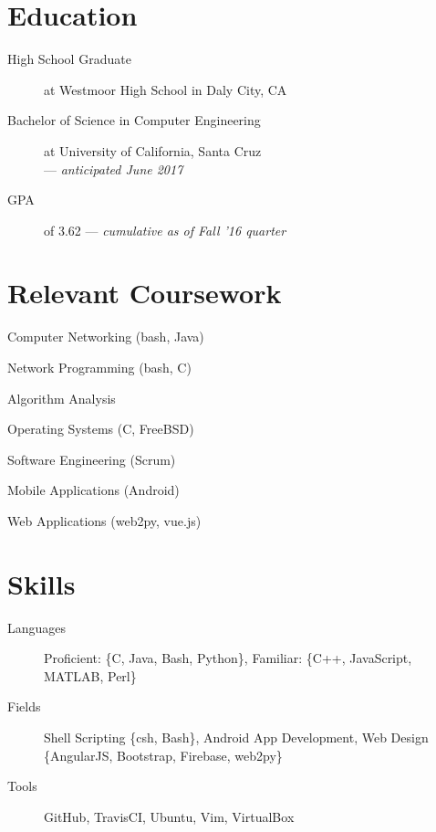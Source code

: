 \documentclass[11pt]{article}
\author{August Valera}
\begin{document}

\section*{Education}
\begin{description}
  \item[High School Graduate] at Westmoor High School in Daly City, CA
  \item[Bachelor of Science in Computer Engineering] at University of
    California, Santa Cruz \\ --- \textit{anticipated June 2017}
  \item[GPA] of 3.62 --- \textit{cumulative as of Fall '16 quarter}
\end{description}

\section*{Relevant Coursework}
\begin{itemize}
    \begin{multicols}{2}
    \item Computer Networking (bash, Java) %
    \item Network Programming (bash, C) %
    \item Algorithm Analysis %
    \item Operating Systems (C, FreeBSD) %
    \item Software Engineering (Scrum) %
    \item Mobile Applications (Android) %
    \item Web Applications (web2py, vue.js) %
    \end{multicols}
\end{itemize}

\section*{Skills}
\begin{description}
  \item[Languages] Proficient: \{C, Java, Bash, Python\},
    Familiar: \{C++, JavaScript, MATLAB, Perl\}
  \item[Fields] Shell Scripting \{csh, Bash\}, Android App Development, Web
    Design \{AngularJS, Bootstrap, Firebase, web2py\}
  \item[Tools] GitHub, TravisCI, Ubuntu, Vim, VirtualBox
\end{description}
\end{document}
